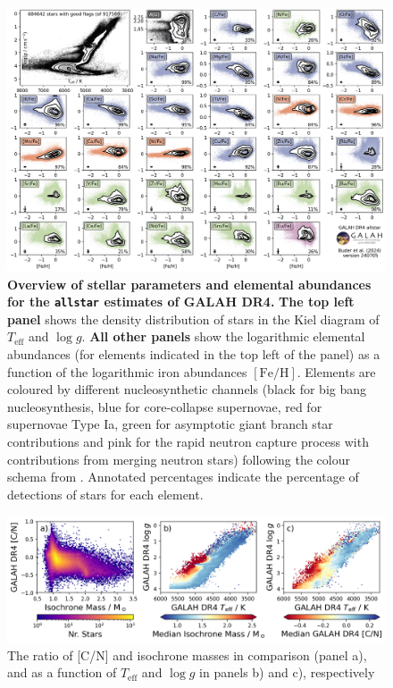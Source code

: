 \documentclass[
  journal=pasa,
  manuscript=research-paper, %
  year=2024,
  volume=37
]{cup-journal}
\newcommand{\Teff}{$T_\mathrm{eff}$\xspace}
\newcommand{\logg}{$\log g$\xspace}
\newcommand{\feh}{$\mathrm{[Fe/H]}$\xspace}
\begin{document}
\begin{landscape}
\begin{figure}[ht]
\includegraphics[width=0.975\columnwidth]{figures/galah_dr4_overview_allstar.png}
\caption{
\textbf{Overview of stellar parameters and elemental abundances for the \texttt{allstar} estimates of GALAH DR4.}
\textbf{The top left panel} shows the density distribution of stars in the Kiel diagram of \Teff and \logg.
\textbf{All other panels} show the logarithmic elemental abundances (for elements indicated in the top left of the panel) as a function of the logarithmic iron abundances \feh. Elements are coloured by different nucleosynthetic channels (black for big bang nucleosynthesis, blue for core-collapse supernovae, red for supernovae Type Ia, green for asymptotic giant branch star contributions and pink for the rapid neutron capture process with contributions from merging neutron stars) following the colour schema from \citet{Kobayashi2020}. Annotated percentages indicate the percentage of detections of stars for each element.
}
\label{fig:galah_dr4_overview_allstar}
\end{figure}
\end{landscape}

\begin{figure}[ht]
    \centering
    \includegraphics[width=\textwidth]{figures/cn_mass.png}
    \caption{The ratio of [C/N] and isochrone masses in comparison (panel a), and as a function of \Teff and \logg in panels b) and c), respectively}
    \label{fig:cn_mass}
\end{figure}
\end{document}
